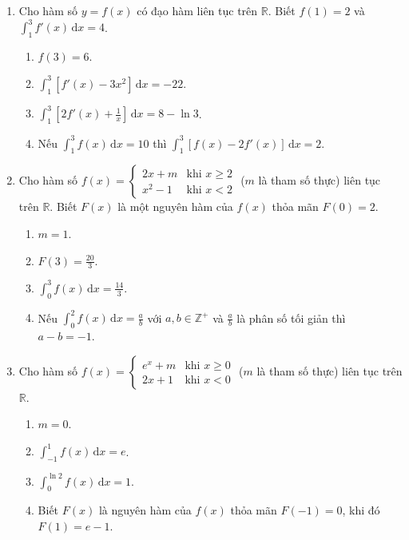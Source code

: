 \documentclass[12pt]{article}
\begin{document}
\begin{enumerate}[label=\textbf{Câu \arabic*.}]
		\item Cho hàm số $y = f(x)$ có đạo hàm liên tục trên $\mathbb{R}$. Biết $f(1) = 2$ và $\displaystyle \int_1^3 f'(x)\,\mathrm{d}x = 4$.
		\begin{enumerate}[label=\alph*)]
			\item $f(3) = 6$.
			\item $\displaystyle \int_1^3 [f'(x) - 3x^2]\,\mathrm{d}x = -22$.
			\item $\displaystyle \int_1^3 \left[2f'(x) + \frac{1}{x}\right]\,\mathrm{d}x = 8 - \ln 3$.
			\item Nếu $\displaystyle \int_1^3 f(x)\,\mathrm{d}x = 10$ thì $\displaystyle \int_1^3 [f(x) - 2f'(x)]\,\mathrm{d}x = 2$.
		\end{enumerate}

		\item Cho hàm số $f(x) = \begin{cases} 2x + m & \text{khi } x \ge 2 \\ x^2 - 1 & \text{khi } x < 2 \end{cases}$ ($m$ là tham số thực) liên tục trên $\mathbb{R}$. Biết $F(x)$ là một nguyên hàm của $f(x)$ thỏa mãn $F(0) = 2$.
		\begin{enumerate}[label=\alph*)]
			\item $m = 1$.
			\item $F(3) = \frac{20}{3}$.
			\item $\displaystyle \int_0^3 f(x)\,\mathrm{d}x = \frac{14}{3}$.
			\item Nếu $\displaystyle \int_0^2 f(x)\,\mathrm{d}x = \frac{a}{b}$ với $a, b \in \mathbb{Z}^+$ và $\frac{a}{b}$ là phân số tối giản thì $a - b = -1$.
		\end{enumerate}
		
		\item Cho hàm số $f(x) = \begin{cases} e^x + m & \text{khi } x \ge 0 \\ 2x + 1 & \text{khi } x < 0 \end{cases}$ ($m$ là tham số thực) liên tục trên $\mathbb{R}$.
		\begin{enumerate}[label=\alph*)]
			\item $m = 0$.
			\item $\displaystyle \int_{-1}^1 f(x)\,\mathrm{d}x = e$.
			\item $\displaystyle \int_0^{\ln 2} f(x)\,\mathrm{d}x = 1$.
			\item Biết $F(x)$ là nguyên hàm của $f(x)$ thỏa mãn $F(-1) = 0$, khi đó $F(1) = e - 1$.
		\end{enumerate}
		

\end{enumerate}
\end{document}
